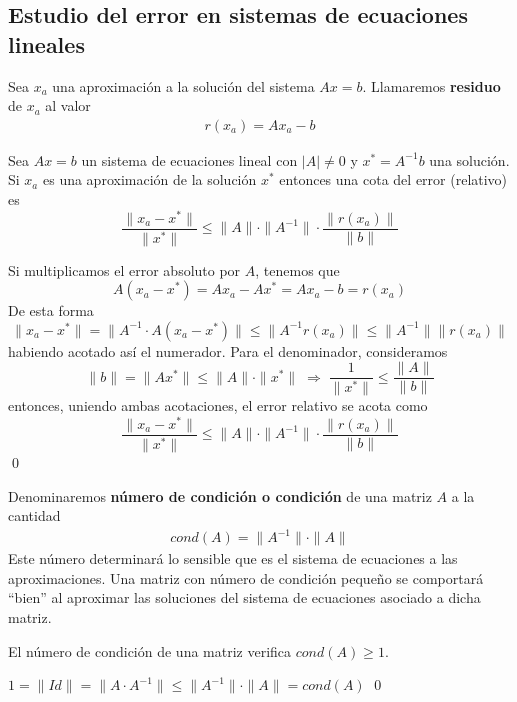     \subsection{Estudio del error en sistemas de ecuaciones lineales}
    \begin{defin}
    Sea $x_a$ una aproximación a la solución del sistema $Ax=b$. Llamaremos \textbf{residuo} de $x_a$ al valor
    \begin{align}
     r(x_a)=Ax_a-b
     \label{resi}
    \end{align}
    \end{defin}
    \begin{prop}
     Sea $Ax=b$ un sistema de ecuaciones lineal con $|A|\neq 0$ y $x^*=A^{-1}b$ una solución. Si $x_a$ es una aproximación de la solución $x^*$ entonces una cota del error (relativo) es
    $$\dfrac{\|x_a-x^*\|}{\|x^*\|}\leq\|A\|\cdot \|A^{-1}\|\cdot \dfrac{\|r(x_a)\|}{\|b\|}  $$    
    \end{prop}
    \begin{dem}
    Si multiplicamos el error absoluto por $A$, tenemos que
    $$A(x_a-x^*)=Ax_a-Ax^*=Ax_a-b=r(x_a)$$
    De esta forma
    $$\|x_a-x^*\|=\|A^{-1} \cdot A(x_a-x^*)\|\leq \|A^{-1}r(x_a)\| \leq \|A^{-1}\| \|r(x_a)\|$$
    habiendo acotado así el numerador. Para el denominador, consideramos
    $$\|b\|=\|Ax^*\|\leq \|A\| \cdot \|x^*\| \; \Rightarrow \; \dfrac{1}{\|x^*\|}\leq \dfrac{\|A\|}{\|b\|}$$
    entonces, uniendo ambas acotaciones, el error relativo se acota como 
    $$\dfrac{\|x_a-x^*\|}{\|x^*\|}  \leq \|A\|\cdot \|A^{-1}\|\cdot \dfrac{\|r(x_a)\|}{\|b\|}$$
    \qed\end{dem}
    
    \begin{defin}
    Denominaremos \textbf{número de condición o condición} de una matriz $A$ a la cantidad
    \begin{align}
         cond(A)=\|A^{-1}\|\cdot \|A\|
         \label{num:cond}
    \end{align}
    Este número determinará lo sensible que es el sistema de ecuaciones a las aproximaciones. Una matriz con número de condición pequeño  se comportará ``bien'' al aproximar las soluciones del sistema de ecuaciones asociado a dicha matriz.
    \end{defin}
    \begin{prop}
        El número de condición de una matriz verifica $cond(A) \geq 1$.
    \end{prop}
    \begin{dem} $1=\|Id\|=\|A\cdot A^{-1}\|\leq \|A^{-1}\|\cdot \|A\|=cond(A)$
    \qed\end{dem}
    
